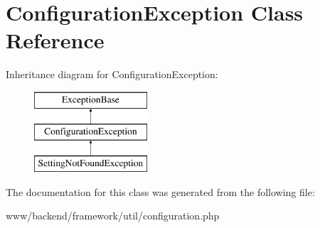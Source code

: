 \hypertarget{classConfigurationException}{
\section{ConfigurationException Class Reference}
\label{classConfigurationException}
}
Inheritance diagram for ConfigurationException:\begin{figure}[H]
\begin{center}
\leavevmode
\includegraphics[height=3.000000cm]{classConfigurationException}
\end{center}
\end{figure}


The documentation for this class was generated from the following file:\begin{DoxyCompactItemize}
\item 
www/backend/framework/util/configuration.php\end{DoxyCompactItemize}
